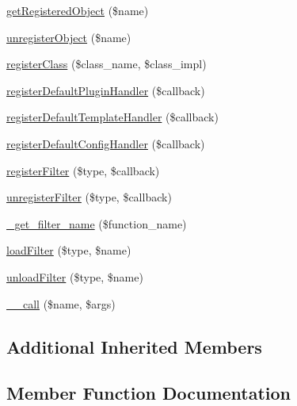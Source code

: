 \begin{DoxyCompactItemize}
\item 
\hyperlink{class_smarty___internal___template_base_a91fb8c8c0ade382052df828a4e7ee500}{get\+Registered\+Object} (\$name)
\item 
\hyperlink{class_smarty___internal___template_base_a4236660295fcf58174d0fb32d2bb8a21}{unregister\+Object} (\$name)
\item 
\hyperlink{class_smarty___internal___template_base_ae0a95f951728523fc1387e5db58182de}{register\+Class} (\$class\+\_\+name, \$class\+\_\+impl)
\item 
\hyperlink{class_smarty___internal___template_base_aa4a9e4236187cd5c6c77f717ad4b4800}{register\+Default\+Plugin\+Handler} (\$callback)
\item 
\hyperlink{class_smarty___internal___template_base_a1480e8ebf192aaebe8633423b61cf8e9}{register\+Default\+Template\+Handler} (\$callback)
\item 
\hyperlink{class_smarty___internal___template_base_a9db71b45991fc21608e3f8b49b215774}{register\+Default\+Config\+Handler} (\$callback)
\item 
\hyperlink{class_smarty___internal___template_base_a61653c230089cfc193ad6da6dabc25e1}{register\+Filter} (\$type, \$callback)
\item 
\hyperlink{class_smarty___internal___template_base_aed8f1c736b9ae65768ebd2609a5d71dd}{unregister\+Filter} (\$type, \$callback)
\item 
\hyperlink{class_smarty___internal___template_base_accd17655aeaafeae11b81bb277306d78}{\+\_\+get\+\_\+filter\+\_\+name} (\$function\+\_\+name)
\item 
\hyperlink{class_smarty___internal___template_base_aa524a2268d3ab6b4cef402728a8fa893}{load\+Filter} (\$type, \$name)
\item 
\hyperlink{class_smarty___internal___template_base_a96e62e0765ce289273401120c1e2dfa3}{unload\+Filter} (\$type, \$name)
\item 
\hyperlink{class_smarty___internal___template_base_af231e86ad32039b9573ae228db5a29fa}{\+\_\+\+\_\+call} (\$name, \$args)
\end{DoxyCompactItemize}
\subsection*{Additional Inherited Members}


\subsection{Member Function Documentation}
\hypertarget{class_smarty___internal___template_base_af231e86ad32039b9573ae228db5a29fa}{}
